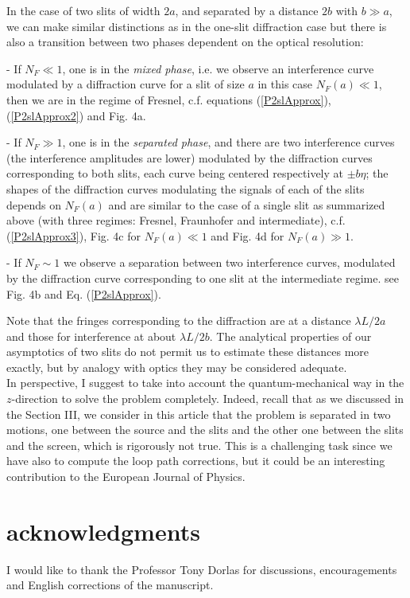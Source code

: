 \documentclass[12pt,aps,prb,preprint]{revtex4-1}   %
\begin{document}
In the case of two slits of width $ 2a $, and separated by a
distance $2b$ with $ b\gg a $, we can make similar distinctions as
in the one-slit diffraction case but there is also a transition
between two phases dependent on the optical resolution:

- If $N_F\ll 1$, one is in the \textit{mixed
phase}, i.e. we observe an interference curve modulated by a
diffraction curve for a slit of size $ a $ in this case $ N_F(a)
\ll 1$, then we are in the regime of Fresnel, c.f. equations
(\ref{P2slApprox}), (\ref{P2slApprox2}) and Fig. 4a.

- If $N_F\gg 1$, one is in the
\textit{separated phase}, and there are two interference curves
(the interference amplitudes are lower) modulated by the
diffraction curves corresponding to both slits, each curve being
centered respectively at $ \pm b\eta $; the shapes of the
diffraction curves modulating the signals of each of the slits
depends on $ N_F(a) $ and are similar to the case of a single slit
as summarized above (with three regimes: Fresnel, Fraunhofer and
intermediate), c.f. (\ref{P2slApprox3}), Fig. 4c for $N_F(a)\ll1$ 
and Fig. 4d for $N_F(a)\gg1$.

 - If $N_F \sim 1$ we observe a separation between two interference curves,
modulated by the diffraction curve corresponding to one slit at the intermediate regime.
see Fig. 4b and Eq. (\ref{P2slApprox}).  

Note that the fringes corresponding to the diffraction are at a
distance $\lambda L/2a$ and those for interference at about
$\lambda L/2b$. The analytical properties of our asymptotics of
two slits do not permit us to estimate these distances more
exactly, but
by analogy with optics they may be considered adequate. \\

In perspective, I suggest to take into account the quantum-mechanical way 
in the $z$-direction to solve the problem completely.
Indeed, recall that as we discussed in the Section III,
we consider in this article that the problem is separated
in two motions, one between the source and the slits 
and the other one between the slits and the screen,
which is rigorously not true. 
This is a challenging task
since we have also to compute the loop path corrections,\cite{Yabuki} 
but it could be an interesting contribution to the European Journal of Physics. 



\section*{acknowledgments}
I would like to thank the Professor Tony Dorlas 
for discussions, encouragements and English corrections of the manuscript.
\end{document}
